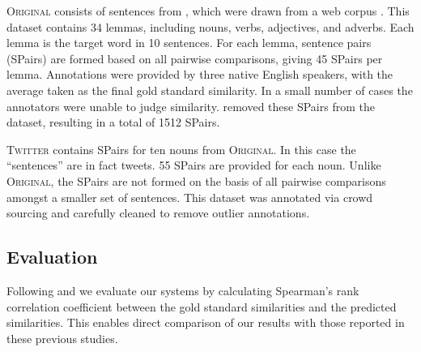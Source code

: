 \documentclass[11pt]{article}
\newcommand\original{\textsc{Original}\xspace}
\newcommand\twitter{\textsc{Twitter}\xspace}
\begin{document}
\original consists of sentences from ,
which were drawn from a web corpus \cite{Sharoff2006b}. This dataset
contains 34 lemmas, including nouns, verbs, adjectives, and
adverbs. Each lemma is the target word in 10 sentences. For each
lemma, sentence pairs (SPairs) are formed based on all pairwise
comparisons, giving 45 SPairs per lemma. Annotations were
provided by three native English speakers, with the average taken as
the final gold standard similarity. In a small number of cases the
annotators were unable to judge similarity. 
removed these SPairs from the dataset, resulting in a total of
1512 SPairs.

\twitter contains SPairs for ten nouns from \original. In this
case the ``sentences'' are in fact tweets. 55 SPairs are
provided for each noun. Unlike \original, the SPairs are not
formed on the basis of all pairwise comparisons amongst a smaller set
of sentences. This dataset was annotated via crowd sourcing and
carefully cleaned to remove outlier annotations.









\subsection{Evaluation\label{sec:evaluation}}
Following  and  we evaluate our
systems by calculating Spearman's rank correlation coefficient between
the gold standard similarities and the predicted similarities. This
enables direct comparison of our results with those reported in these
previous studies.



\end{document}
